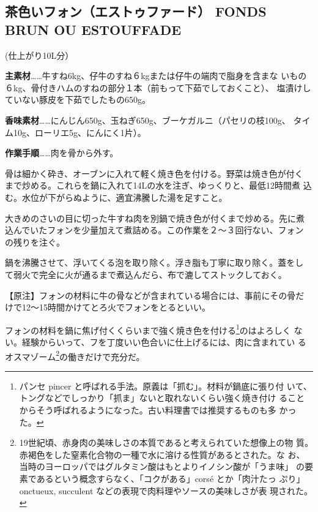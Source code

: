 \documentclass[twoside,12Q,b5paper]{escoffierltjsbook}
\begin{document}
\subsection*{茶色いフォン（エストゥファード） FONDS BRUN OU
ESTOUFFADE}\label{ux8336ux8272ux3044ux30d5ux30a9ux30f3ux30a8ux30b9ux30c8ux30a5ux30d5ux30a1ux30fcux30c9-fonds-brun-ou-estouffade}

(仕上がり10L分）

\textbf{主素材}\ldots{}\ldots{}牛すね6kg、仔牛のすね６kgまたは仔牛の端肉で脂身を含まな
いもの６kg、骨付きハムのすねの部分１本（前もって下茹でしておくこと）、
塩漬けしていない豚皮を下茹でしたもの650g。

\textbf{香味素材}\ldots{}\ldots{}にんじん650g、玉ねぎ650g、ブーケガルニ（パセリの枝100g、
タイム10g、ローリエ5g、にんにく1片）。

\textbf{作業手順}\ldots{}\ldots{}肉を骨から外す。

骨は細かく砕き、オーブンに入れて軽く焼き色を付ける。野菜は焼き色が付く
まで炒める。これらを鍋に入れて14Lの水を注ぎ、ゆっくりと、最低12時間煮
込む。水位が下がらぬように、適宜沸騰した湯を足すこと。

大きめのさいの目に切った牛すね肉を別鍋で焼き色が付くまで炒める。先に煮
込んでいたフォンを少量加えて煮詰める。この作業を２〜３回行ない、フォン
の残りを注ぐ。

鍋を沸騰させて、浮いてくる泡を取り除く。浮き脂も丁寧に取り除く。蓋をし
て弱火で完全に火が通るまで煮込んだら、布で漉してストックしておく。

【原注】フォンの材料に牛の骨などが含まれている場合には、事前にその骨だ
けで12〜15時間かけてとろ火でフォンをとるといい。

フォンの材料を鍋に焦げ付くくらいまで強く焼き色を付ける\footnote{パンセ
  pincer と呼ばれる手法。原義は「抓む」。材料が鍋底に張り付
  いて、トングなどでしっかり「抓ま」ないと取れないくらい強く焼き付け
  ることからそう呼ばれるようになった。古い料理書では推奨するものも多
  かった。}のはよろしく
ない。経験からいって、フを丁度いい色合いに仕上げるには、肉に含まれてい
るオスマゾーム\footnote{19世紀頃、赤身肉の美味しさの本質であると考えられていた想像上の物
  質。赤褐色をした窒素化合物の一種で水に溶ける性質があるとされた。な
  お、当時のヨーロッパではグルタミン酸はもとよりイノシン酸が「うま味」
  の要素であるという概念すらなく、「コクがある」corsé とか「肉汁たっ
  ぷり」onctueux, succulent などの表現で肉料理やソースの美味しさが表
  現された。}の働きだけで充分だ。
\end{document}

